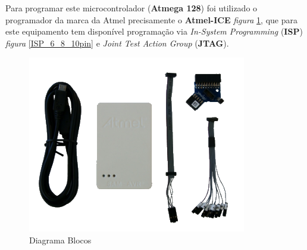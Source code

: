 Para programar este microcontrolador (\textbf{Atmega 128}) foi utilizado o programador da marca da Atmel precisamente o \textbf{Atmel-ICE} \textit{figura} \ref{Programador_1}, que para este equipamento tem disponível programação via \textit{In-System Programming} (\textbf{ISP}) \textit{figura} \ref{ISP_6_8_10pin} e \textit{Joint Test Action Group} (\textbf{JTAG}).
\begin{minipage}[!b]{.5\linewidth}
	\begin{figure}[H]
		\captionsetup{justification=raggedright,singlelinecheck=false}
		\flushleft
		\includegraphics[scale=0.75]{./image/PESTA/programador/Atmel_ice.png}
		\caption{Diagrama Blocos}
		\label{Programador_1}
	\end{figure}
\end{minipage}
\hspace{.5cm}

